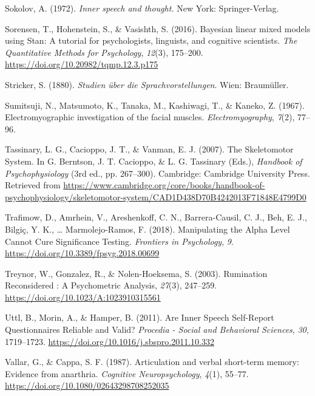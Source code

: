 \documentclass[a4paper,12pt,twoside,openright,oldfontcommands]{memoir}
\begin{document}
\hypertarget{ref-sokolov_inner_1972}{}
Sokolov, A. (1972). \emph{Inner speech and thought.} New York:
Springer-Verlag.

\hypertarget{ref-sorensen_bayesian_2016}{}
Sorensen, T., Hohenstein, S., \& Vasishth, S. (2016). Bayesian linear
mixed models using Stan: A tutorial for psychologists, linguists, and
cognitive scientists. \emph{The Quantitative Methods for Psychology},
\emph{12}(3), 175--200. \url{https://doi.org/10.20982/tqmp.12.3.p175}

\hypertarget{ref-stricker_studien_1880}{}
Stricker, S. (1880). \emph{Studien über die Sprachvorstellungen}. Wien:
Braumüller.

\hypertarget{ref-sumitsuji_electromyographic_1967}{}
Sumitsuji, N., Matsumoto, K., Tanaka, M., Kashiwagi, T., \& Kaneko, Z.
(1967). Electromyographic investigation of the facial muscles.
\emph{Electromyography}, \emph{7}(2), 77--96.

\hypertarget{ref-berntson_skeletomotor_2007}{}
Tassinary, L. G., Cacioppo, J. T., \& Vanman, E. J. (2007). The
Skeletomotor System. In G. Berntson, J. T. Cacioppo, \& L. G. Tassinary
(Eds.), \emph{Handbook of Psychophysiology} (3rd ed., pp. 267--300).
Cambridge: Cambridge University Press. Retrieved from
\url{https://www.cambridge.org/core/books/handbook-of-psychophysiology/skeletomotor-system/CAD1D438D70B4242013F71848E4799D0}

\hypertarget{ref-trafimow_manipulating_2018}{}
Trafimow, D., Amrhein, V., Areshenkoff, C. N., Barrera-Causil, C. J.,
Beh, E. J., Bilgiç, Y. K., \ldots{} Marmolejo-Ramos, F. (2018).
Manipulating the Alpha Level Cannot Cure Significance Testing.
\emph{Frontiers in Psychology}, \emph{9}.
\url{https://doi.org/10.3389/fpsyg.2018.00699}

\hypertarget{ref-treynor_rumination_2003}{}
Treynor, W., Gonzalez, R., \& Nolen-Hoeksema, S. (2003). Rumination
Reconsidered : A Psychometric Analysis, \emph{27}(3), 247--259.
\url{https://doi.org/10.1023/A:1023910315561}

\hypertarget{ref-Uttl2011}{}
Uttl, B., Morin, A., \& Hamper, B. (2011). Are Inner Speech Self-Report
Questionnaires Reliable and Valid? \emph{Procedia - Social and
Behavioral Sciences}, \emph{30}, 1719--1723.
\url{https://doi.org/10.1016/j.sbspro.2011.10.332}

\hypertarget{ref-vallar_articulation_1987}{}
Vallar, G., \& Cappa, S. F. (1987). Articulation and verbal short-term
memory: Evidence from anarthria. \emph{Cognitive Neuropsychology},
\emph{4}(1), 55--77. \url{https://doi.org/10.1080/02643298708252035}
\end{document}
